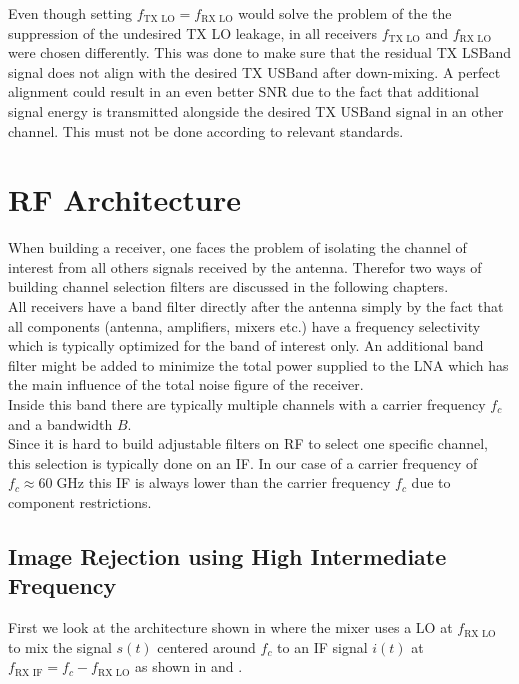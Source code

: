 Even though setting $f_{\text{TX LO}} = f_{\text{RX LO}}$
would solve the problem of the the suppression of the
undesired \gls{TX} \gls{LO} leakage, in all receivers
$f_{\text{TX LO}}$ and $f_{\text{RX LO}}$ were chosen differently.
This was done to make sure that the residual \gls{TX} \gls{LSBand}
signal does not align with the desired \gls{TX} \gls{USBand} after
down-mixing. A perfect alignment could result in an even better
\gls{SNR} due to the fact that additional signal energy is transmitted
alongside the desired \gls{TX} \gls{USBand} signal in an other channel.
This must not be done according to relevant standards. \\

\section{RF Architecture}
When building a receiver, one faces the problem of isolating the channel of
interest from all others signals received by the antenna. Therefor
two ways of building channel selection filters are discussed in the following
chapters. \\

All receivers have a band filter directly after the antenna simply by the
fact that all components (antenna, amplifiers, mixers etc.) have a frequency
selectivity which is typically optimized for the band of interest only.
An additional band filter might be added to minimize the total power supplied
to the \gls{LNA} which has the main influence of the total noise figure of
the receiver. \\

Inside this band there are typically multiple channels with a carrier frequency
$f_c$ and a bandwidth $B$. \\

Since it is hard to build adjustable filters on \gls{RF} to select one specific
channel, this selection is typically done on an \acrfull{IF}. In our case of a
carrier frequency of $f_c \approx 60 \;\text{GHz}$ this \gls{IF}
is always lower than the carrier frequency $f_c$ due to component restrictions. \\

\subsection{Image Rejection using High Intermediate Frequency}
\label{sec:rx_rf_0}
First we look at the architecture shown in  where
the mixer uses a \gls{LO} at $f_{\text{RX LO}}$ to mix the signal $s(t)$
centered around $f_{c}$ to an \gls{IF} signal $i(t)$ at
$f_{\text{RX IF}} = f_{c} - f_{\text{RX LO}}$ as shown in 
and . \\

